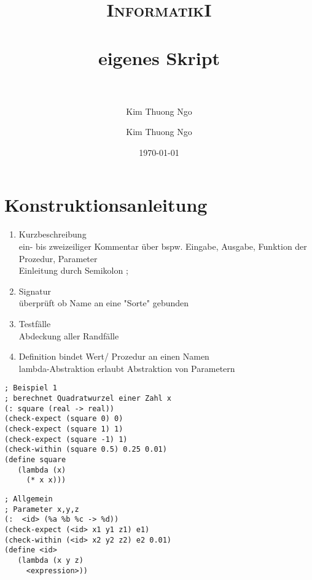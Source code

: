 \documentclass[paper=a4, fontsize=11pt]{scrartcl}
\author{Kim Thuong Ngo}
\title{	
\normalfont \normalsize 
\textsc{InformatikI} \\ [25pt] 
\horrule{0.5pt} \\[0.4cm] 
\huge eigenes Skript \\ 
\horrule{2pt} \\[0.5cm] 
}
\author{Kim Thuong Ngo}
\date{\normalsize\today}
\numberwithin{equation}{section}
\numberwithin{figure}{section}
\numberwithin{table}{section}
\begin{document}
\maketitle 
\newpage
\tableofcontents
\newpage
\section{Konstruktionsanleitung}
\begin{enumerate}
\item Kurzbeschreibung \\
         ein- bis zweizeiliger Kommentar über bspw. Eingabe, Ausgabe, Funktion der Prozedur, Parameter \\
         Einleitung durch Semikolon ;
 \item Signatur \\
          überprüft ob Name an eine "Sorte" gebunden \\
 \item Testfälle \\
          Abdeckung aller Randfälle
 \item Definition 
          bindet Wert/ Prozedur an einen Namen \\
          lambda-Abstraktion erlaubt Abstraktion von Parametern
\end{enumerate}
\begin{lstlisting}
; Beispiel 1
; berechnet Quadratwurzel einer Zahl x 
(: square (real -> real))
(check-expect (square 0) 0)
(check-expect (square 1) 1)
(check-expect (square -1) 1)
(check-within (square 0.5) 0.25 0.01)
(define square
   (lambda (x)
     (* x x)))
\end{lstlisting}
\begin{lstlisting}
; Allgemein
; Parameter x,y,z 
(:  <id> (%a %b %c -> %d))
(check-expect (<id> x1 y1 z1) e1)
(check-within (<id> x2 y2 z2) e2 0.01)
(define <id>
   (lambda (x y z)
     <expression>))
\end{lstlisting}

\end{document}
